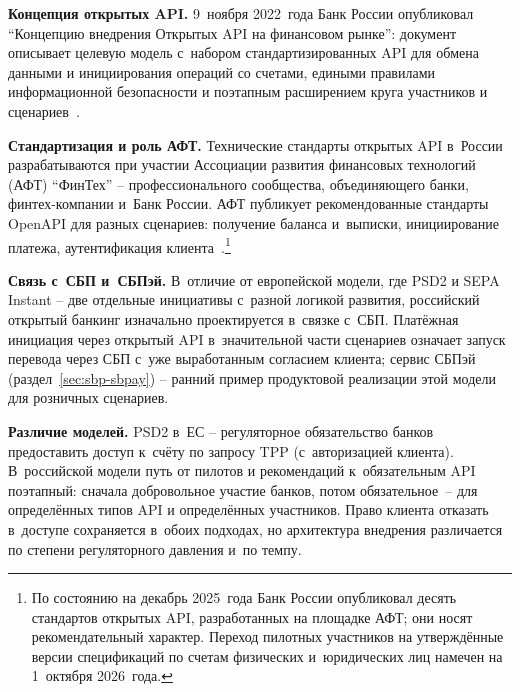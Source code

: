 \textbf{Концепция открытых API.} 9~ноября 2022~года Банк России
опубликовал \enquote{Концепцию внедрения Открытых API на финансовом
рынке}: документ описывает целевую модель с~набором
стандартизированных API для обмена данными и инициирования операций
со счетами, едиными правилами информационной безопасности
и поэтапным расширением круга участников
и сценариев~\cite{cbr-open-api-concept}.

\textbf{Стандартизация и роль АФТ.} Технические стандарты открытых
API в~России разрабатываются при участии Ассоциации развития
финансовых технологий (АФТ) \enquote{ФинТех} -- профессионального
сообщества, объединяющего банки, финтех-компании и~Банк России.
АФТ публикует рекомендованные стандарты OpenAPI для разных сценариев:
получение баланса и~выписки, инициирование платежа, аутентификация
клиента~\cite{afe-open-api}.\footnote{По состоянию на декабрь
2025~года Банк России опубликовал десять стандартов открытых API,
разработанных на площадке АФТ; они носят рекомендательный
характер. Переход пилотных участников на утверждённые версии
спецификаций по счетам физических и~юридических лиц намечен
на 1~октября 2026~года.}

\textbf{Связь с~СБП и~СБПэй.} В~отличие от европейской модели, где
PSD2 и SEPA Instant -- две отдельные инициативы с~разной логикой
развития, российский открытый банкинг изначально проектируется
в~связке с~СБП. Платёжная инициация через открытый API
в~значительной части сценариев означает запуск перевода через СБП
с~уже выработанным согласием клиента; сервис СБПэй
(раздел~\ref{sec:sbp-sbpay}) -- ранний пример продуктовой реализации
этой модели для розничных сценариев.

\textbf{Различие моделей.} PSD2 в~ЕС -- регуляторное обязательство
банков предоставить доступ к~счёту по запросу TPP (с~авторизацией
клиента). В~российской модели путь от пилотов и рекомендаций
к~обязательным API поэтапный: сначала добровольное участие банков,
потом обязательное~-- для определённых типов API и определённых
участников. Право клиента отказать в~доступе сохраняется в~обоих
подходах, но архитектура внедрения различается по степени
регуляторного давления и~по темпу.


